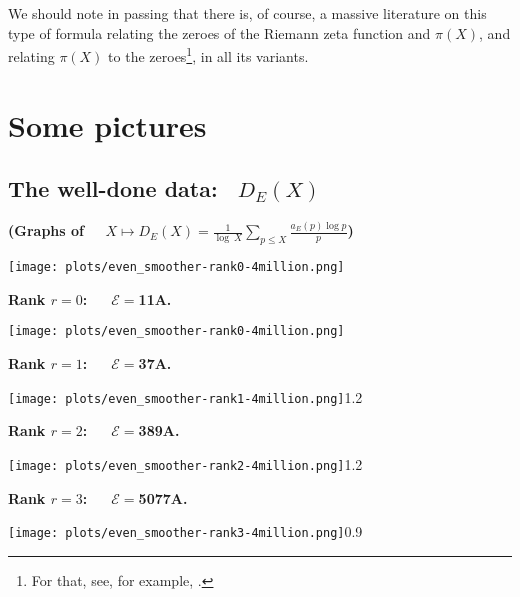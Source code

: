 \documentclass[11pt]{article}
\theoremstyle{plain}
\theoremstyle{definition}
\numberwithin{equation}{section}
\numberwithin{figure}{section}
\numberwithin{table}{section}
\begin{document}
We should note in passing that there is, of course, a massive literature on this type of formula relating the zeroes of the Riemann zeta function and $\pi(X)$, and relating $\pi(X)$ to the zeroes{\footnote{ For that, see, for example, \cite{G}.}}, in all its variants.


\section{Some pictures}
  \vskip30pt


     \subsection{The well-done data: \  $ {D}_E(X)$}
   \vskip40pt

      \centerline{\bf (Graphs of \ \   $X\mapsto {D}_E(X) = {\frac{1}{\log\ X}}\sum_{p \le X}{\frac{a_E(p)\log p}{ p}}$) }
      \vskip40pt

    \texttt{[image: plots/even\_smoother-rank0-4million.png]}
  \centerline{\bf Rank $r=0$:\ \ \  ${\mathcal E}=$11A.}
   \vskip20pt
    \texttt{[image: plots/even\_smoother-rank0-4million.png]}


 \vskip40pt


  \centerline{\bf Rank $r=1$:\ \ \  ${\mathcal E}=$37A.}


   \vskip20pt



     \texttt{[image: plots/even\_smoother-rank1-4million.png]}{1.2}~\label{s37}
%

   \newpage


  \centerline{\bf Rank $r=2$:\ \ \  ${\mathcal E}=$389A.}


  \vskip20pt




     \texttt{[image: plots/even\_smoother-rank2-4million.png]}{1.2}~\label{s389}


 \vskip20pt


  \centerline{\bf Rank $r=3$:\ \ \  ${\mathcal E}=$5077A.}


 \vskip20pt



     \texttt{[image: plots/even\_smoother-rank3-4million.png]}{0.9}~\label{s5077}


  \vskip10pt
\end{document}
